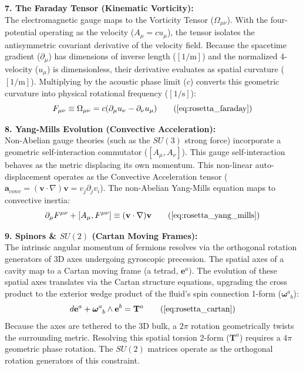 \textbf{7. The Faraday Tensor (Kinematic Vorticity):} \\
The electromagnetic gauge maps to the Vorticity Tensor ($\Omega_{\mu\nu}$). With the four-potential operating as the velocity ($A_\mu = c u_\mu$), the tensor isolates the antisymmetric covariant derivative of the velocity field. Because the spacetime gradient ($\partial_\mu$) has dimensions of inverse length ($[1/\text{m}]$) and the normalized 4-velocity ($u_\mu$) is dimensionless, their derivative evaluates as spatial curvature ($[1/\text{m}]$). Multiplying by the acoustic phase limit ($c$) converts this geometric curvature into physical rotational frequency ($[1/\text{s}]$):
\begin{equation}
    F_{\mu\nu} \equiv \Omega_{\mu\nu} = c (\partial_\mu u_\nu - \partial_\nu u_\mu) \tag{\ref{eq:rosetta_faraday}}
\end{equation}

\textbf{8. Yang-Mills Evolution (Convective Acceleration):} \\
Non-Abelian gauge theories (such as the $SU(3)$ strong force) incorporate a geometric self-interaction commutator ($[A_\mu, A_\nu]$). This gauge self-interaction behaves as the metric displacing its own momentum. This non-linear auto-displacement operates as the Convective Acceleration tensor ($\mathbf{a}_{conv} = (\mathbf{v} \cdot \nabla)\mathbf{v} = v_j \partial_j v_i$). The non-Abelian Yang-Mills equation maps to convective inertia: 
\begin{equation}
    \partial_\mu F^{\mu\nu} + [A_\mu, F^{\mu\nu}] \equiv (\mathbf{v} \cdot \nabla)\mathbf{v} \tag{\ref{eq:rosetta_yang_mills}} 
\end{equation}

\textbf{9. Spinors \& $SU(2)$ (Cartan Moving Frames):} \\
The intrinsic angular momentum of fermions resolves via the orthogonal rotation generators of 3D axes undergoing gyroscopic precession. The spatial axes of a cavity map to a Cartan moving frame (a tetrad, $\mathbf{e}^a$). The evolution of these spatial axes translates via the Cartan structure equations, upgrading the cross product to the exterior wedge product of the fluid's spin connection 1-form ($\boldsymbol{\omega}^a_{\phantom{a}b}$): 
\begin{equation}
    d\mathbf{e}^a + \boldsymbol{\omega}^a_{\phantom{a}b} \wedge \mathbf{e}^b = \mathbf{T}^a \tag{\ref{eq:rosetta_cartan}} 
\end{equation}
Because the axes are tethered to the 3D bulk, a $2\pi$ rotation geometrically twists the surrounding metric. Resolving this spatial torsion 2-form ($\mathbf{T}^a$) requires a $4\pi$ geometric phase rotation. The $SU(2)$ matrices operate as the orthogonal rotation generators of this constraint.

